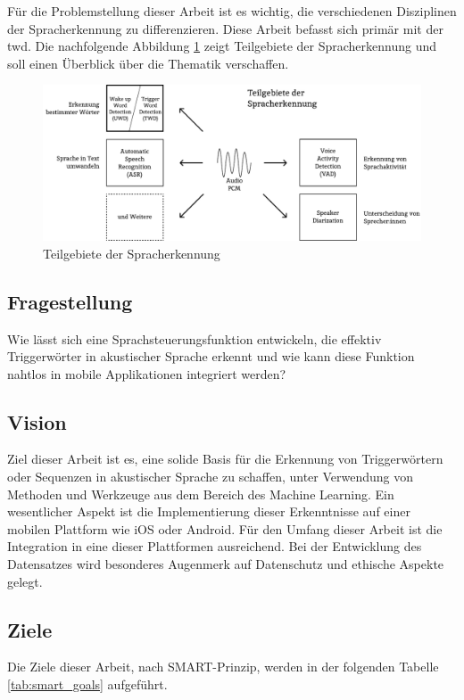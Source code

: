 \documentclass[11pt,a4paper]{article}
\begin{document}
\noindent \newline
Für die Problemstellung dieser Arbeit ist es wichtig, die verschiedenen Disziplinen der
Spracherkennung zu differenzieren. Diese Arbeit befasst sich primär mit der \gls{twd}. Die 
nachfolgende Abbildung \ref{fig:asr_twd} zeigt Teilgebiete der Spracherkennung und soll 
einen Überblick über die Thematik verschaffen. 

\vspace{1em}
\begin{figure}[h]
	\centering
	\includegraphics[width=1.0\linewidth]{img/asr_twd.pdf}
	\caption{Teilgebiete der Spracherkennung}
	\label{fig:asr_twd}

\end{figure}

\subsection{Fragestellung}
Wie lässt sich eine Sprachsteuerungsfunktion entwickeln, die effektiv Triggerwörter in akustischer 
Sprache erkennt und wie kann diese Funktion nahtlos in mobile Applikationen integriert werden?


\subsection{Vision}
Ziel dieser Arbeit ist es, eine solide Basis für die Erkennung von Triggerwörtern oder Sequenzen in 
akustischer Sprache zu schaffen, unter Verwendung von Methoden und Werkzeuge aus dem Bereich des 
Machine Learning. Ein wesentlicher Aspekt ist die Implementierung dieser Erkenntnisse auf einer 
mobilen Plattform wie iOS oder Android. Für den Umfang dieser Arbeit ist die Integration in eine 
dieser Plattformen ausreichend. Bei der Entwicklung des Datensatzes wird besonderes Augenmerk auf 
Datenschutz und ethische Aspekte gelegt.

\subsection{Ziele}
Die Ziele dieser Arbeit, nach SMART-Prinzip, werden in der folgenden Tabelle \ref{tab:smart_goals} 
aufgeführt.
\end{document}
